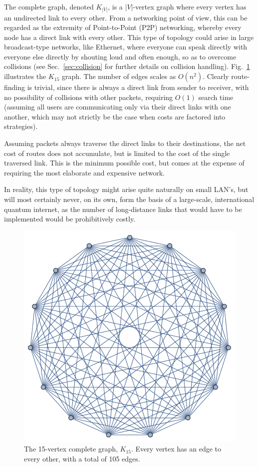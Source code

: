 \documentclass[aps,rmp,twocolumn,amsmath,amssymb,nofootinbib,superscriptaddress,longbibliography,floatfix]{revtex4-1}
\begin{document}
The complete graph, denoted $K_{|V|}$, is a $|V|$-vertex graph where every vertex has an undirected link to every other. From a networking point of view, this can be regarded as the extremity of Point-to-Point (P2P) networking, whereby every node has a direct link with every other. This type of topology could arise in large broadcast-type networks, like Ethernet, where everyone can speak directly with everyone else directly by shouting loud and often enough, so as to overcome collisions (see Sec.~\ref{sec:collision} for further details on collision handling). Fig.~\ref{fig:complete_graph} illustrates the $K_{15}$ graph. The number of edges scales as $O(n^2)$. Clearly route-finding is trivial, since there is always a direct link from sender to receiver, with no possibility of collisions with other packets, requiring $O(1)$ search time (assuming all users are communicating only via their direct links with one another, which may not strictly be the case when costs are factored into strategies).

Assuming packets always traverse the direct links to their destinations, the net cost of routes does not accumulate, but is limited to the cost of the single traversed link. This is the minimum possible cost, but comes at the expense of requiring the most elaborate and expensive network.

In reality, this type of topology might arise quite naturally on small LAN's, but will most certainly never, on its own, form the basis of a large-scale, international quantum internet, as the number of long-distance links that would have to be implemented would be prohibitively costly.

\begin{figure}[!htb]
\includegraphics[width=0.7\columnwidth]{K_15}
\caption{The 15-vertex complete graph, $K_{15}$. Every vertex has an edge to every other, with a total of 105 edges.} \label{fig:complete_graph}
\end{figure}
\end{document}
